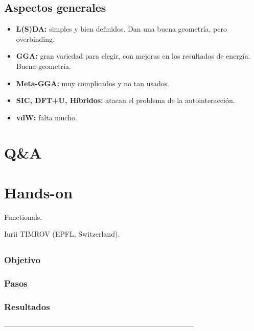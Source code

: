 \subsection{Aspectos generales}

  \begin{itemize}
    \item \textbf{L(S)DA:} simples y bien definidos. Dan una buena geometría, pero overbinding.
    \item \textbf{GGA:} gran variedad para elegir, con mejoras en los resultados de energía. Buena geometría.
    \item \textbf{Meta-GGA:} muy complicados y no tan usados.
    \item \textbf{SIC, DFT+U, Híbridos:} atacan el problema de la autointeracción.
    \item \textbf{vdW:} falta mucho.
  \end{itemize}

\section{Q\&A}



\section{Hands-on}

 Functionals.

 Iurii TIMROV (EPFL, Switzerland).

\subsection{}

\subsubsection{Objetivo}

\subsubsection{Pasos}

\subsubsection{Resultados}



--------------------------------------------------------------------------------

